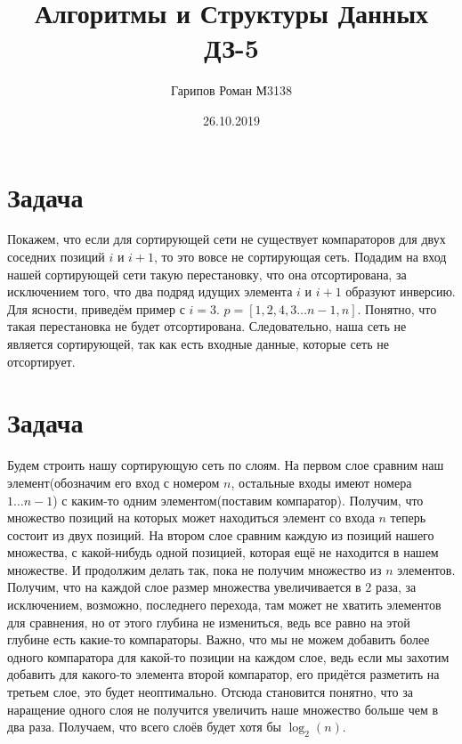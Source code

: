 \documentclass{article}
\title{Алгоритмы и Структуры Данных ДЗ-5}
\date{26.10.2019}
\author{Гарипов Роман М3138}
\begin{document}
  \maketitle
  \newpage

\section*{Задача }
Покажем, что если для сортирующей сети не существует компараторов для двух соседних позиций $i$ и $i + 1$, то это вовсе не сортирующая сеть.
Подадим на вход нашей сортирующей сети такую перестановку, что она отсортирована, за исключением того, что два подряд идущих элемента $i$ и $i + 1$ образуют инверсию. Для ясности, приведём пример с $i = 3$. $p = [1, 2, 4, 3 \dots n - 1, n]$. Понятно, что такая перестановка не будет отсортирована. Следовательно, наша сеть не является сортирующей, так как есть входные данные, которые сеть не отсортирует.

\section*{Задача }
Будем строить нашу сортирующую сеть по слоям.
\newline
 На первом слое сравним наш элемент(обозначим его вход с номером $n$, остальные входы имеют номера $1 \dots n - 1$) с каким-то одним элементом(поставим компаратор). Получим, что множество позиций на которых может находиться элемент со входа $n$ теперь состоит из двух позиций.   \newline
 На втором слое сравним каждую из позиций нашего множества, с какой-нибудь одной позицией, которая ещё не находится в нашем множестве. И продолжим делать так, пока не получим множество из $n$ элементов.
\newline 
Получим, что на каждой слое размер множества увеличивается в $2$ раза, за исключением, возможно, последнего перехода, там может не хватить элементов для сравнения, но от этого глубина не измениться, ведь все равно на этой глубине есть какие-то компараторы. 
\newline
 Важно, что мы не можем добавить более одного компаратора для какой-то позиции на каждом слое, ведь если мы захотим добавить для какого-то элемента второй компаратор, его придётся разметить на третьем слое, это будет неоптимально.  
\newline 
Отсюда становится понятно, что за наращение одного слоя не получится увеличить наше множество больше чем в два раза.
\newline
Получаем, что всего слоёв будет хотя бы $\log_{2}(n)$.
\end{document}
